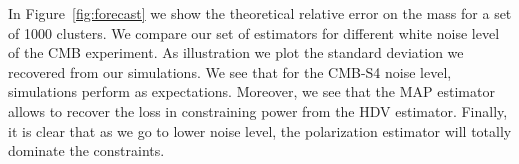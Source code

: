 \documentclass[prd, superscriptaddress, tightenlines, longbibliography, nofootinbib, eqsecnum, amsfonts, amsmath, floatfix, twocolumn, notitlepage]{revtex4-2}
\newcommand{\JC}[1]{\color{purple}{{JC:#1}}\color{black}\xspace}
\begin{document}
In Figure~\ref{fig:forecast} we show the theoretical relative error on the mass for a set of 1000 clusters. We compare our set of estimators for different white noise level of the CMB experiment. As illustration we plot the standard deviation we recovered from our simulations.  We see that for the CMB-S4 noise level, simulations perform as expectations. Moreover, we see that the MAP estimator allows to recover the loss in constraining power from the HDV estimator. Finally, it is clear that as we go to lower noise level, the polarization estimator will totally dominate the constraints. 

\end{document}
